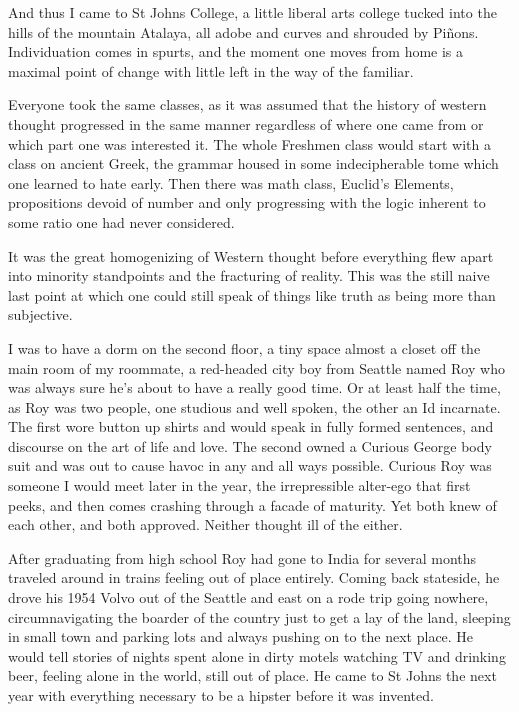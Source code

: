 \documentclass[ebook, 10pt, openright, onecolumn]{memoir}
\newcommand*\td[1]{
  \todo[inline]{
     #1 
  }
}
\newcommand*\finish{\td{ ----- Finish this section -----}}
\begin{document}
And thus I came to St Johns College, a little liberal arts college tucked into
the hills of the mountain Atalaya, all adobe and curves and shrouded by Piñons.
Individuation comes in spurts, and the moment one moves from home is a maximal
point of change with little left in the way of the familiar.

Everyone took the same classes, as it was assumed that the history of western
thought progressed in the same manner regardless of where one came from or which
part one was interested it.  The whole Freshmen class would start with a class
on ancient Greek, the grammar housed in some indecipherable tome which one
learned to hate early.  Then there was math class, Euclid's Elements,
propositions devoid of number and only progressing with the logic inherent to
some ratio one had never considered.

It was the great homogenizing of Western thought before everything flew apart
into minority standpoints and the fracturing of reality.  This was the still
naive last point at which one could still speak of things like truth as being
more than subjective.
\finish

I was to have a dorm on the second floor, a tiny space almost a closet off the
main room of my roommate, a red-headed city boy from Seattle named Roy who was
always sure he's about to have a really good time.  Or at least half the time,
as Roy was two people, one studious and well spoken, the other an Id incarnate.
The first wore button up shirts and would speak in fully formed sentences, and
discourse on the art of life and love.  The second owned a Curious George body
suit and was out to cause havoc in any and all ways possible.  Curious Roy was
someone I would meet later in the year, the irrepressible alter-ego that first
peeks, and then comes crashing through a facade of maturity.  Yet both knew of
each other, and both approved.  Neither thought ill of the either.

After graduating from high school Roy had gone to India for several months
traveled around in trains feeling out of place entirely.  Coming back stateside,
he drove his 1954 Volvo out of the Seattle and east on a rode trip going
nowhere, circumnavigating the boarder of the country just to get a lay of the
land, sleeping in small town and parking lots and always pushing on to the next
place.  He would tell stories of nights spent alone in dirty motels watching TV
and drinking beer, feeling alone in the world, still out of place.  He came to
St Johns the next year with everything necessary to be a hipster before it was
invented.
\end{document}
